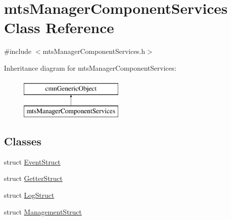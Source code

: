 \hypertarget{classmts_manager_component_services}{}\section{mts\+Manager\+Component\+Services Class Reference}
\label{classmts_manager_component_services}


{\ttfamily \#include $<$mts\+Manager\+Component\+Services.\+h$>$}

Inheritance diagram for mts\+Manager\+Component\+Services\+:\begin{figure}[H]
\begin{center}
\leavevmode
\includegraphics[height=2.000000cm]{db/dc6/classmts_manager_component_services}
\end{center}
\end{figure}
\subsection*{Classes}
\begin{DoxyCompactItemize}
\item 
struct \hyperlink{structmts_manager_component_services_1_1_event_struct}{Event\+Struct}
\item 
struct \hyperlink{structmts_manager_component_services_1_1_getter_struct}{Getter\+Struct}
\item 
struct \hyperlink{structmts_manager_component_services_1_1_log_struct}{Log\+Struct}
\item 
struct \hyperlink{structmts_manager_component_services_1_1_management_struct}{Management\+Struct}
\end{DoxyCompactItemize}
